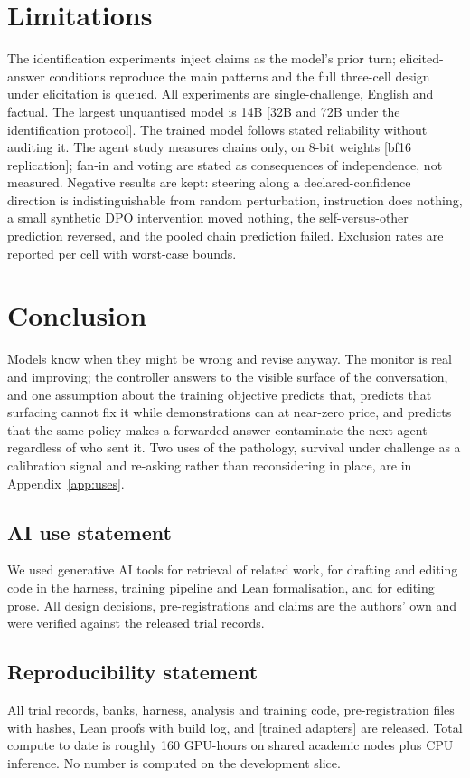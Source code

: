 \documentclass{article}
\newcommand{\pending}[1]{\textcolor{blue!70!black}{[#1]}}
\begin{document}
\section{Limitations}
The identification experiments inject claims as the model's prior turn; elicited-answer conditions reproduce the main patterns and the full three-cell design under elicitation is queued. All experiments are single-challenge, English and factual. The largest unquantised model is 14B \pending{32B and 72B under the identification protocol}. The trained model follows stated reliability without auditing it. The agent study measures chains only, on 8-bit weights \pending{bf16 replication}; fan-in and voting are stated as consequences of independence, not measured. Negative results are kept: steering along a declared-confidence direction is indistinguishable from random perturbation, instruction does nothing, a small synthetic DPO intervention moved nothing, the self-versus-other prediction reversed, and the pooled chain prediction failed. Exclusion rates are reported per cell with worst-case bounds.

\section{Conclusion}
Models know when they might be wrong and revise anyway. The monitor is real and improving; the controller answers to the visible surface of the conversation, and one assumption about the training objective predicts that, predicts that surfacing cannot fix it while demonstrations can at near-zero price, and predicts that the same policy makes a forwarded answer contaminate the next agent regardless of who sent it. Two uses of the pathology, survival under challenge as a calibration signal and re-asking rather than reconsidering in place, are in Appendix~\ref{app:uses}.

\subsection*{AI use statement}
We used generative AI tools for retrieval of related work, for drafting and editing code in the harness, training pipeline and Lean formalisation, and for editing prose. All design decisions, pre-registrations and claims are the authors' own and were verified against the released trial records.
\subsection*{Reproducibility statement}
All trial records, banks, harness, analysis and training code, pre-registration files with hashes, Lean proofs with build log, and \pending{trained adapters} are released. Total compute to date is roughly 160 GPU-hours on shared academic nodes plus CPU inference. No number is computed on the development slice.
\end{document}
